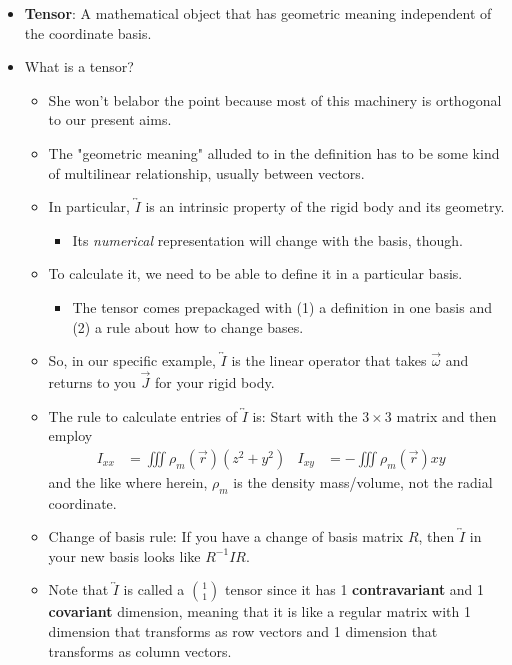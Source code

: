 \documentclass[../notes.tex]{subfiles}
\begin{document}
\begin{itemize}
    \item \textbf{Tensor}: A mathematical object that has geometric meaning independent of the coordinate basis.
    \item What is a tensor?
    \begin{itemize}
        \item She won't belabor the point because most of this machinery is orthogonal to our present aims.
        \item The "geometric meaning" alluded to in the definition has to be some kind of multilinear relationship, usually between vectors.
        \item In particular, $\overleftrightarrow{I}$ is an intrinsic property of the rigid body and its geometry.
        \begin{itemize}
            \item Its \emph{numerical} representation will change with the basis, though.
        \end{itemize}
        \item To calculate it, we need to be able to define it in a particular basis.
        \begin{itemize}
            \item The tensor comes prepackaged with (1) a definition in one basis and (2) a rule about how to change bases.
        \end{itemize}
        \item So, in our specific example, $\overleftrightarrow{I}$ is the linear operator that takes $\vec{\omega}$ and returns to you $\vec{J}$ for your rigid body.
        \item The rule to calculate entries of $\overleftrightarrow{I}$ is: Start with the $3\times 3$ matrix and then employ
        \begin{align*}
            I_{xx} &= \iiint\rho_m(\vec{r})(z^2+y^2)&
            I_{xy} &= -\iiint\rho_m(\vec{r})xy&
        \end{align*}
        and the like where herein, $\rho_m$ is the density mass/volume, not the radial coordinate.
        \item Change of basis rule: If you have a change of basis matrix $R$, then $\overleftrightarrow{I}$ in your new basis looks like $R^{-1}IR$.
        \item Note that $\overleftrightarrow{I}$ is called a $\binom{1}{1}$ tensor since it has 1 \textbf{contravariant} and 1 \textbf{covariant} dimension, meaning that it is like a regular matrix with 1 dimension that transforms as row vectors and 1 dimension that transforms as column vectors.

\end{itemize}
\end{itemize}
\end{document}
